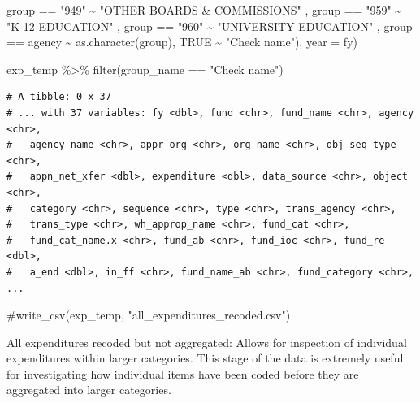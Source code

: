 \documentclass[
  letterpaper,
  DIV=11,
  numbers=noendperiod]{scrreport}
\newenvironment{Shaded}{\begin{snugshade}}{\end{snugshade}}
\newcommand{\AttributeTok}[1]{\textcolor[rgb]{0.40,0.45,0.13}{#1}}
\newcommand{\CommentTok}[1]{\textcolor[rgb]{0.37,0.37,0.37}{#1}}
\newcommand{\ConstantTok}[1]{\textcolor[rgb]{0.56,0.35,0.01}{#1}}
\newcommand{\FunctionTok}[1]{\textcolor[rgb]{0.28,0.35,0.67}{#1}}
\newcommand{\NormalTok}[1]{\textcolor[rgb]{0.00,0.23,0.31}{#1}}
\newcommand{\SpecialCharTok}[1]{\textcolor[rgb]{0.37,0.37,0.37}{#1}}
\newcommand{\StringTok}[1]{\textcolor[rgb]{0.13,0.47,0.30}{#1}}
\begin{document}
\begin{Shaded}
\begin{Highlighting}[]
\NormalTok{             group }\SpecialCharTok{==} \StringTok{"949"} \SpecialCharTok{\textasciitilde{}} \StringTok{"OTHER BOARDS \& COMMISSIONS"}\NormalTok{ ,}
\NormalTok{             group }\SpecialCharTok{==} \StringTok{"959"} \SpecialCharTok{\textasciitilde{}} \StringTok{"K{-}12 EDUCATION"}\NormalTok{ ,}
\NormalTok{             group }\SpecialCharTok{==} \StringTok{"960"} \SpecialCharTok{\textasciitilde{}} \StringTok{"UNIVERSITY EDUCATION"}\NormalTok{ ,}
\NormalTok{             group }\SpecialCharTok{==}\NormalTok{ agency }\SpecialCharTok{\textasciitilde{}} \FunctionTok{as.character}\NormalTok{(group),}
             \ConstantTok{TRUE} \SpecialCharTok{\textasciitilde{}} \StringTok{"Check name"}\NormalTok{),}
         \AttributeTok{year =}\NormalTok{ fy)}

\NormalTok{exp\_temp }\SpecialCharTok{\%\textgreater{}\%} \FunctionTok{filter}\NormalTok{(group\_name }\SpecialCharTok{==} \StringTok{"Check name"}\NormalTok{)}
\end{Highlighting}
\end{Shaded}

\begin{verbatim}
# A tibble: 0 x 37
# ... with 37 variables: fy <dbl>, fund <chr>, fund_name <chr>, agency <chr>,
#   agency_name <chr>, appr_org <chr>, org_name <chr>, obj_seq_type <chr>,
#   appn_net_xfer <dbl>, expenditure <dbl>, data_source <chr>, object <chr>,
#   category <chr>, sequence <chr>, type <chr>, trans_agency <chr>,
#   trans_type <chr>, wh_approp_name <chr>, fund_cat <chr>,
#   fund_cat_name.x <chr>, fund_ab <chr>, fund_ioc <chr>, fund_re <dbl>,
#   a_end <dbl>, in_ff <chr>, fund_name_ab <chr>, fund_category <chr>, ...
\end{verbatim}

\begin{Shaded}
\begin{Highlighting}[]
\CommentTok{\#write\_csv(exp\_temp, "all\_expenditures\_recoded.csv")}
\end{Highlighting}
\end{Shaded}

\begin{tcolorbox}[enhanced jigsaw, coltitle=black, titlerule=0mm, leftrule=.75mm, colbacktitle=quarto-callout-important-color!10!white, arc=.35mm, rightrule=.15mm, opacityback=0, colframe=quarto-callout-important-color-frame, toptitle=1mm, opacitybacktitle=0.6, bottomtitle=1mm, title=\textcolor{quarto-callout-important-color}{\faExclamation}\hspace{0.5em}{Important}, colback=white, breakable, toprule=.15mm, left=2mm, bottomrule=.15mm]

All expenditures recoded but not aggregated: Allows for inspection of
individual expenditures within larger categories. This stage of the data
is extremely useful for investigating how individual items have been
coded before they are aggregated into larger categories.

\end{tcolorbox}
\end{document}
